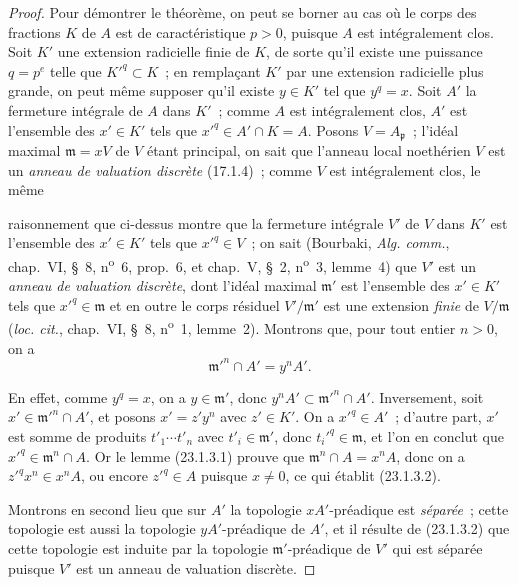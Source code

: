 \begin{proof}
Pour démontrer le théorème, on peut se borner au cas où le corps des fractions
$K$ de $A$ est de caractéristique $p>0$, puisque $A$ est intégralement clos.
Soit $K'$ une extension radicielle finie de $K$, de sorte qu'il existe une
puissance $q=p^e$ telle que $K'^q\subset K$~; en remplaçant $K'$ par une
extension radicielle plus grande, on peut même supposer qu'il existe $y\in K'$
tel que $y^q=x$. Soit $A'$ la fermeture intégrale de $A$ dans $K'$~; comme
$A$ est intégralement clos, $A'$ est l'ensemble des $x'\in K'$ tels que
$x'^q\in A'\cap K=A$. Posons $V=A_{\mathfrak p}$~; l'idéal maximal
$\mathfrak m=xV$ de $V$ étant principal, on sait que l'anneau local
noethérien $V$ est un \emph{anneau de valuation discrète} (17.1.4)~; comme
$V$ est intégralement clos, le même


raisonnement que ci-dessus montre que la fermeture intégrale $V'$ de $V$ dans
$K'$ est l'ensemble des $x'\in K'$ tels que $x'^q\in V$~; on sait
(Bourbaki, \emph{Alg. comm.}, chap.~VI, §~8, n\textsuperscript{o}~6,
prop.~6, et chap.~V, §~2, n\textsuperscript{o}~3, lemme~4) que $V'$ est un
\emph{anneau de valuation discrète}, dont l'idéal maximal $\mathfrak m'$ est
l'ensemble des $x'\in K'$ tels que $x'^q\in\mathfrak m$ et en outre le corps
résiduel $V'/\mathfrak m'$ est une extension \emph{finie} de
$V/\mathfrak m$ (\emph{loc. cit.}, chap.~VI, §~8,
n\textsuperscript{o}~1, lemme~2). Montrons que, pour tout entier $n>0$, on a
\begin{equation}
\label{0.23.1.3.2-fr}
  \mathfrak m'^n\cap A'=y^nA'.
  \tag{23.1.3.2}
\end{equation}

En effet, comme $y^q=x$, on a $y\in\mathfrak m'$, donc
$y^nA'\subset\mathfrak m'^n\cap A'$. Inversement, soit
$x'\in\mathfrak m'^n\cap A'$, et posons $x'=z'y^n$ avec $z'\in K'$. On a
$x'^q\in A'$~; d'autre part, $x'$ est somme de produits
$t'_1\cdots t'_n$ avec $t'_i\in\mathfrak m'$, donc
$t_i'^q\in\mathfrak m$, et l'on en conclut que
$x'^q\in\mathfrak m^n\cap A$. Or le lemme (23.1.3.1) prouve que
$\mathfrak m^n\cap A=x^nA$, donc on a $z'^qx^n\in x^nA$, ou encore
$z'^q\in A$ puisque $x\neq0$, ce qui établit (23.1.3.2).

Montrons en second lieu que sur $A'$ la topologie $xA'$-préadique est
\emph{séparée}~; cette topologie est aussi la topologie $yA'$-préadique de
$A'$, et il résulte de (23.1.3.2) que cette topologie est induite par la
topologie $\mathfrak m'$-préadique de $V'$ qui est séparée puisque $V'$ est
un anneau de valuation discrète.


\end{proof}
